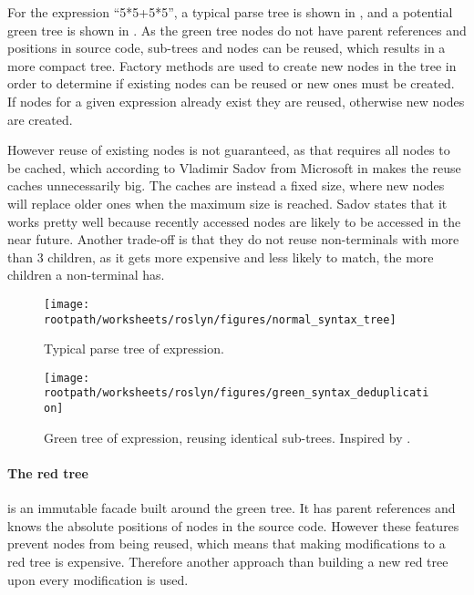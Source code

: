For the expression ``5*5+5*5'', a typical parse tree is shown in , and a potential green tree is shown in . As the green tree nodes do not have parent references and positions in source code, sub-trees and nodes can be reused, which results in a more compact tree. Factory methods are used to create new nodes in the tree in order to determine if existing nodes can be reused or new ones must be created. If nodes for a given expression already exist they are reused, otherwise new nodes are created.

However reuse of existing nodes is not guaranteed, as that requires all nodes to be cached, which according to Vladimir Sadov from Microsoft in \cite{sadovRoslynPerf} makes the reuse caches unnecessarily big. The caches are instead a fixed size, where new nodes will replace older ones when the maximum size is reached. Sadov states that it works pretty well because recently accessed nodes are likely to be accessed in the near future. Another trade-off is that they do not reuse non-terminals with more than 3 children, as it gets more expensive and less likely to match, the more children a non-terminal has\cite{sadovRoslynPerf}.

\begin{figure}[htbp]
\centering
\texttt{[image: \\rootpath/worksheets/roslyn/figures/normal\_syntax\_tree]}
\caption{Typical parse tree of expression.}
\label{fig:normal_syntax_tree}
\end{figure}

\begin{figure}[htbp]
\centering
\texttt{[image: \\rootpath/worksheets/roslyn/figures/green\_syntax\_deduplication]}
\caption{Green tree of expression, reusing identical sub-trees. Inspired by \cite{sadovRoslynPerf}.}
\label{fig:green_syntax_deduplication}
\end{figure}

\paragraph{The red tree} is an immutable facade built around the green tree. It has parent references and knows the absolute positions of nodes in the source code. However these features prevent nodes from being reused, which means that making modifications to a red tree is expensive. Therefore another approach than building a new red tree upon every modification\cite{lippert2012redgreen} is used.

